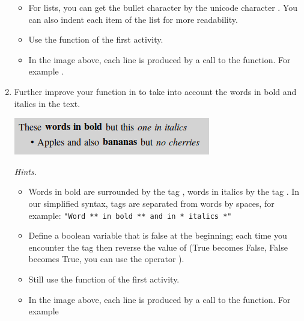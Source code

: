 \documentclass[11pt,class=report,crop=false]{standalone}
\begin{document}
\begin{activite}
\begin{enumerate}
\begin{itemize}
    \item For lists, you can get the bullet character \og{}\textbullet\fg{} by the unicode character . You can also indent each item of the list for more readability.
    
    \item Use the  function of the first activity.
    
    \item In the image above, each line is produced by a call to the function. For example .
   \end{itemize}


  \item Further improve your function in  to take into account the words in bold and italics in the text.
  
\begin{center}
\includegraphics[scale=0.7]{screen-markdown-5-en}
\end{center}   
 
 	\emph{Hints.}
  \begin{itemize}
    \item Words in bold are surrounded by the tag \ci{**}, words in italics by the tag \ci{*}. In our simplified syntax, tags are separated from words by spaces, for example: \lstinline!"Word ** in bold ** and in * italics *"!
    
    
    \item Define a boolean variable  that is false at the beginning; each time you encounter the tag \ci{**} then reverse the value of  (\og{}True\fg{} becomes \og{}False\fg{}, \og{}False\fg{} becomes \og{}True\fg{}, you can use the operator ).
    
    \item Still use the  function of the first activity.
    
    \item In the image above, each line is produced by a call to the function. For example 
   \end{itemize} 
   

\end{enumerate}
\end{activite}
\end{document}
